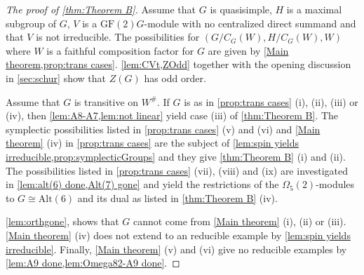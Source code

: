 \documentclass[12pt]{amsart}
\theoremstyle{remark}
\theoremstyle{notation}
\theoremstyle{definition}
\newcommand{\GF}{\mathrm{GF}}
\newcommand{\0}{\emptyset}
\newcommand{\Alt}{\mathrm{Alt}}
\begin{document}
\begin{proof}[The proof of \cref{thm:Theorem B}] Assume that $G$ is quasisimple, $H$ is a maximal subgroup of $G$, $V$ is a $\GF(2)G$-module with no centralized direct summand and that $V$ is not irreducible.  The possibilities for $(G/C_G(W),H/C_G(W),W)$ where $W$ is a faithful composition factor for $G$ are given by \cref{Main theorem,prop:trans cases}. \cref{lem:CVt,ZOdd} together with the opening discussion in \cref{sec:schur} show that $Z(G)$ has odd order.

Assume that $G$ is transitive on $W^\#$. If $G$ is as in \cref{prop:trans cases} (i), (ii), (iii) or (iv), then \cref{lem:A8-A7,lem:not linear} yield case (iii) of \cref{thm:Theorem B}. The symplectic possibilities listed in \cref{prop:trans cases} (v) and (vi) and \cref{Main theorem} (iv)  in \cref{prop:trans cases} are the subject of \cref{lem:spin yields irreducible,prop:symplecticGroups} and they give \cref{thm:Theorem B} (i) and (ii). The possibilities listed in \cref{prop:trans cases} (vii), (viii) and (ix) are investigated in \cref{lem:alt(6) done,Alt(7) gone} and yield the restrictions of the $\Omega_5(2)$-modules to $G \cong \Alt(6)$ and its dual as listed in \cref{thm:Theorem B} (iv).


\cref{lem:orthgone}, shows that  $G$ cannot come from   \cref{Main theorem} (i), (ii) or (iii). \cref{Main theorem} (iv) does not extend to an reducible example by \cref{lem:spin yields irreducible}.  Finally, \cref{Main theorem} (v) and (vi) give no reducible examples by \cref{lem:A9 done,lem:Omega82-A9 done}.
\end{proof}
\printbibliography

 
\end{document}
